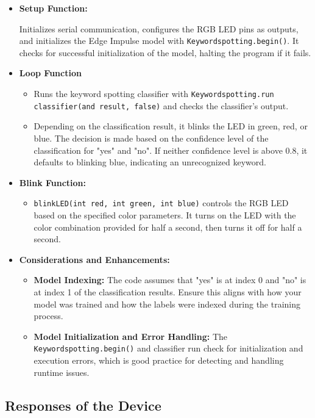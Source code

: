 \begin{itemize}
	\item \textbf{Setup Function:} 
	\begin{itemize}
		Initializes serial communication, configures the RGB LED pins as outputs, and initializes the Edge Impulse model with \texttt{Keywordspotting.begin()}. It checks for successful initialization of the model, halting the program if it fails.
	\end{itemize}
	\item \textbf{Loop Function}
	\begin{itemize}
		\item Runs the keyword spotting classifier with \texttt{Keywordspotting.run classifier(and result, false)} and checks the classifier's output.
		\item Depending on the classification result, it blinks the LED in green, red, or blue. The decision is made based on the confidence level of the classification for "yes" and "no". If neither confidence level is above 0.8, it defaults to blinking blue, indicating an unrecognized keyword.
	\end{itemize}
	\item \textbf{ Blink Function:}
	\begin{itemize}
		\item \texttt{blinkLED(int red, int green, int blue)} controls the RGB LED based on the specified color parameters. It turns on the LED with the color combination provided for half a second, then turns it off for half a second.
	\end{itemize}
	\item \textbf{ Considerations and Enhancements:}
	\begin{itemize}
		\item \textbf{ Model Indexing:} The code assumes that "yes" is at index 0 and "no" is at index 1 of the classification results. Ensure this aligns with how your model was trained and how the labels were indexed during the training process.
		\item \textbf{Model Initialization and Error Handling:} The \texttt{Keywordspotting.begin()} and classifier run check for initialization and execution errors, which is good practice for detecting and handling runtime issues.
	\end{itemize}
\end{itemize}

\subsection{Responses of the Device}

